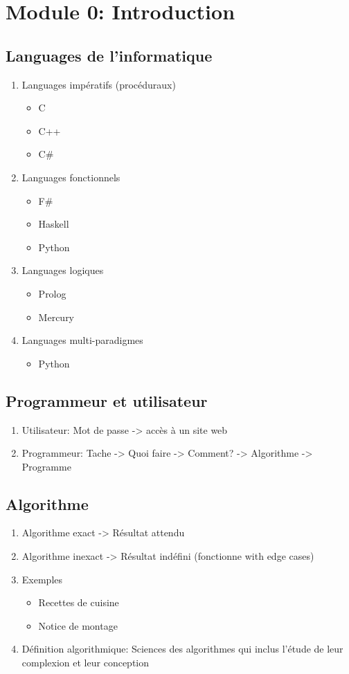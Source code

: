 \chapter{Module 0: Introduction}
\section{Languages de l'informatique}
\begin{enumerate}
  \item Languages impératifs (procéduraux)
  \begin{itemize}
    \item C
    \item C++ 
    \item C\#
  \end{itemize}
  \item Languages fonctionnels
  \begin{itemize}
    \item F\#
    \item Haskell
    \item Python
  \end{itemize}
  \item Languages logiques
  \begin{itemize}
    \item Prolog
    \item Mercury
  \end{itemize}
  \item Languages multi-paradigmes
  \begin{itemize}
    \item Python
  \end{itemize}
\end{enumerate}
\section{Programmeur et utilisateur}
\begin{enumerate}
  \item Utilisateur: Mot de passe -> accès à un site web
  \item Programmeur: Tache -> Quoi faire -> Comment? -> Algorithme -> Programme
\end{enumerate}
\section{Algorithme}
\begin{enumerate}
  \item Algorithme exact -> Résultat attendu
  \item Algorithme inexact -> Résultat indéfini (fonctionne with edge cases)
  \item Exemples
  \begin{itemize}
    \item Recettes de cuisine
    \item Notice de montage
  \end{itemize}
  \item Définition algorithmique: Sciences des algorithmes qui inclus l'étude de leur complexion et leur conception
\end{enumerate}
